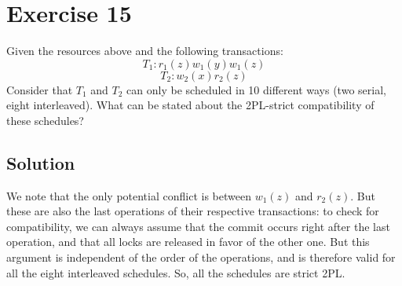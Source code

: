 \section{Exercise 15}

Given the resources above and the following transactions:
\[T_1: r_1(z) w_1(y) w_1(z)\] 
\[T_2: w_2(x) r_2(z)\]
Consider that $T_1$ and $T_2$ can only be scheduled in 10 different ways (two serial, eight interleaved). 
What can be stated about the 2PL-strict compatibility of these schedules? 

\subsection*{Solution}
We note that the only potential conflict is between $w_1(z)$ and $r_2(z)$.
But these are also the last operations of their respective transactions: to check for compatibility, we can always assume that the commit occurs right after the last operation, and that all locks are released in favor of the other one. 
But this argument is independent of the order of the operations, and is therefore valid for all the eight interleaved schedules. So, all the schedules are strict 2PL. 